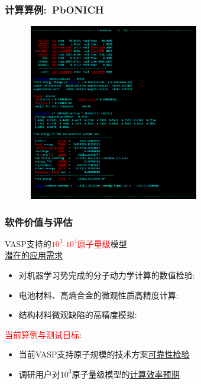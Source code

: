 \begin{frame}
	\frametitle{计算算例:~\textrm{PbONICH}}
\begin{figure}[h!]
\centering
\vskip -0.21in
\includegraphics[height=3.05in,width=3.00in,viewport=0 0 1000 1152,clip]{Figures/VASP_huge_Ningde-PbONICH_OUTCAR.png}
\label{VASP_Model-3}
\end{figure} 
\end{frame}

\frame
{
	\frametitle{软件价值与评估}
\textrm{VASP}支持的\textcolor{red}{$10^3$-$10^4$原子量级}模型\\
\underline{潜在的应用需求}
\begin{itemize}
		\setlength{\itemsep}{10pt}
		\item 	对机器学习势完成的分子动力学计算的数值检验:\\
			{\fontsize{7.2pt}{5.2pt}\selectfont{是否可以彻底摆脱对第一原理大规模计算的约束}}
		\item 电池材料、高熵合金的微观性质高精度计算:\\
			{\fontsize{7.2pt}{5.2pt}\selectfont{高精度的应用级模拟}}
		\item 结构材料微观缺陷的高精度模拟:\\
			{\fontsize{7.2pt}{5.2pt}\selectfont{高精度的材料可观测实验组数据对照}}
	\end{itemize}
	\vskip 5pt
	\textcolor{red}{当前算例与测试目标}:~
	\begin{itemize}
		\item 当前\textrm{VASP}支持原子规模的技术方案\underline{可靠性检验}
		\item 调研用户对$10^3$原子量级模型的\underline{计算效率预期}
	\end{itemize}
}


